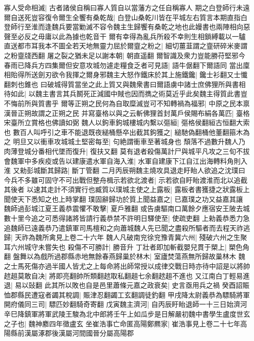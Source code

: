 寡人受命相滅|{
	古者諸侯自稱曰寡人質自以當藩方之任自稱寡人}
期之白登師行未遠爾自送死豈容復令爾生全饗有桑乾哉|{
	白登山桑乾川皆在平城左右質言本期直指白登師行至淮而逢魏兵要當勦滅不容令魏主生歸饗有桑乾之地也此嫚書也兩陣相向惡聲至必反之毋庸以此為據也乾音干}
爾有幸得為亂兵所殺不幸則生相鎖縛載以一驢直送都市耳我本不圖全若天地無靈力屈於爾韲之粉之|{
	細切薑韮謂之韲研碎米麥謂之粉韲牋西翻}
屠之裂之猶未足以謝本朝|{
	朝直遥翻}
爾智識及衆力豈能勝苻堅邪今春雨已降兵方四集爾但安意攻城勿遽走糧食乏者可見語|{
	語牛倨翻下爾語同}
當出廩相貽得所送劍刃欲令我揮之爾身邪魏主大怒作鐵床於其上施鐵鑱|{
	鑱士衫翻又士懴翻刺也錐也}
曰破城得質當坐之此上質又與魏衆書曰爾語虜中諸士庶佛狸所與書相待如此|{
	以魏主書言其兵鬭死正減國中賊也因而擕之術莫近乎此矣魏主得質此書豈不悔前所與質書乎}
爾等正朔之民何為自取糜滅豈可不知轉禍為福邪|{
	中原之民本禀漢晉正朔故謂之正朔之民}
并寫臺格以與之云斬佛狸首封萬戶侯賜布絹各萬匹|{
	臺格宋臺所立賞格也佛讀如弼}
魏人以鉤車鉤城樓城内繫以彄絙|{
	彄格侯翻絙古恒翻大索也}
數百人叫呼引之車不能退既夜縋桶懸卒出截其鉤獲之|{
	縋馳偽翻桶他董翻箍木為之}
明旦又以衝車攻城城土堅密每至|{
	句絶謂衝車至著城身也}
頹落不過數升魏人乃肉薄登城分番相代墜而復升|{
	復扶又翻}
莫有退者殺傷萬計尸與城平凡攻之三旬不拔會魏軍中多疾疫或告以建康遣水軍自海入淮|{
	水軍自建康下江自江出海轉料角則入淮}
又勑彭城斷其歸路|{
	斷丁管翻}
二月丙辰朔魏主燒攻具退走盱眙人欲追之沈璞曰今兵不多雖可固守不可出戰但整舟楫示若欲北渡者|{
	示若欲自盱眙渡淮而北以追截其後者}
以速其走計不須實行也臧質以璞城主使之上露板|{
	露板者書獲捷之狀露板上聞使天下悉知之也上時掌翻}
璞固辭歸功於質上聞益嘉之|{
	已嘉璞之功又益嘉其讓}
魏師過彭城江夏王義恭震懼不敢擊|{
	夏戶雅翻}
或告虜驅南口萬餘夕應宿安王陂去城數十里今追之可悉得諸將皆請行義恭禁不許明日驛使至|{
	使疏吏翻}
上勑義恭悉力急追魏師已遠義恭乃遣鎮軍司馬檀和之向蕭城魏人先已聞之盡殺所驅者而去程天祚逃歸|{
	天祚為魏所禽見上卷二十六年}
魏人凡破南兖徐兖豫青冀六州|{
	殘破六州之生聚耳六州城守未嘗失也}
殺傷不可勝計|{
	勝音升}
丁壯者即加斬截嬰兒貫于槊上|{
	槊色角翻}
盤舞以為戲所過郡縣赤地無餘春燕歸巢於林木|{
	室廬焚蕩燕無所歸故巢林木}
魏之士馬死傷亦過半國人皆尤之上每命將出師常授以成律交戰日時亦待中詔是以將帥趑趄莫敢自决|{
	將即亮翻帥所類翻趑取私翻趄七余翻趑趄不進也}
又江南白丁輕易進退|{
	易以䜴翻}
此其所以敗也自是邑里蕭條元嘉之政衰矣|{
	史言亟用兵之禍}
癸酉詔賑恤郡縣民遭寇者蠲其稅調|{
	賑津忍翻蠲工玄翻調徒釣翻}
甲戌降太尉義恭為驃騎將軍開府儀同三司|{
	驃匹妙翻騎奇寄翻}
戊寅魏主濟河|{
	自丙辰盱眙退師一十三日始濟河}
辛巳降鎮軍將軍武陵王駿為北中郎將壬午上如瓜步是日解嚴初魏中書學生盧度世玄之子也|{
	魏神䴥四年徵盧玄}
坐崔浩事亡命匿高陽鄭羆家|{
	崔浩事見上卷二十七年高陽縣前漢屬涿郡後漢屬河間國晉分屬高陽郡}
